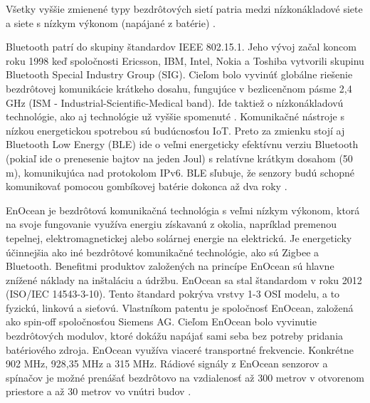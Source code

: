 \documentclass[twoside]{ctuthesis}
\theoremstyle{plain}
\theoremstyle{definition}
\theoremstyle{note}
\begin{document}
Všetky vyššie zmienené typy bezdrôtových sietí patria medzi nízkonákladové siete a siete s nízkym výkonom (napájané z batérie) \cite{comunication}.
\newline

Bluetooth patrí do skupiny štandardov IEEE 802.15.1. Jeho vývoj začal koncom roku 1998 keď spoločnosti Ericsson, IBM, Intel, Nokia a Toshiba vytvorili skupinu Bluetooth Special Industry Group (SIG). Cieľom bolo vyvinúť globálne riešenie bezdrôtovej komunikácie krátkeho dosahu, fungujúce v bezlicenčnom pásme 2,4 GHz (ISM - Industrial-Scientific-Medical band). Ide taktiež o nízkonákladovú technológie, ako aj technológie už vyššie spomenuté \cite{bluetooth}. 
Komunikačné nástroje s nízkou energetickou spotrebou sú budúcnosťou IoT. Preto za zmienku stojí aj Bluetooth Low Energy (BLE) ide o veľmi energeticky efektívnu verziu Bluetooth (pokiaľ ide o prenesenie bajtov na jeden Joul) s relatívne krátkym dosahom (50 m), komunikujúca nad protokolom IPv6. BLE sľubuje, že senzory budú schopné komunikovať pomocou gombíkovej batérie dokonca až dva roky \cite{ble} \cite{casio}.
\newline

EnOcean je bezdrôtová komunikačná technológia s veľmi nízkym výkonom, ktorá na svoje fungovanie využíva energiu získavanú z okolia, napríklad premenou tepelnej, elektromagnetickej alebo solárnej energie na elektrickú. Je energeticky účinnejšia ako iné bezdrôtové komunikačné technológie, ako sú Zigbee a Bluetooth. Benefitmi produktov založených na princípe EnOcean sú hlavne znížené náklady na inštaláciu a údržbu.
EnOcean sa stal štandardom v roku 2012 (ISO/IEC 14543-3-10). Tento štandard pokrýva vrstvy 1-3 OSI modelu, a to fyzickú, linkovú a sieťovú. Vlastníkom patentu je spoločnosť EnOcean, založená ako spin-off spoločnosťou Siemens AG. Cieľom EnOcean bolo vyvinutie bezdrôtových modulov, ktoré dokážu napájať sami seba bez potreby pridania batériového zdroja.
EnOcean využíva viaceré transportné frekvencie. Konkrétne 902 MHz, 928,35 MHz a 315 MHz.
Rádiové signály z EnOcean senzorov a spínačov je možné prenášať bezdrôtovo na vzdialenosť až 300 metrov v otvorenom priestore a až 30 metrov vo vnútri budov \cite{enocean}\cite{enoceancvut}. 
\newline
\end{document}

